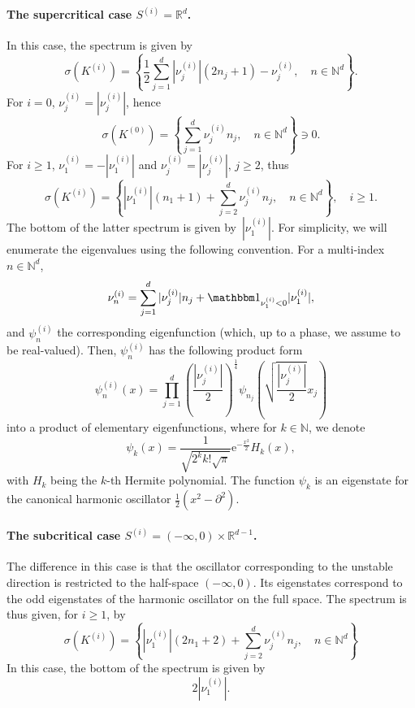 \documentclass[10pt]{article}
\newcommand{\e}{\mathrm{e}}
\newcommand{\R}{\mathbb{R}}
\newcommand{\N}{\mathbb N}
\newcommand{\1}{\mathbbm 1}
\begin{document}
    \paragraph{The supercritical case $S^{(i)} = \R^d$.\newline}
    In this case, the spectrum is given by
    \[\sigma(K^{(i)}) = \left\{ \frac12\sum_{j=1}^d |\nu_j^{(i)}|(2n_j+1)-\nu_j^{(i)},\quad n\in\N^d\right\}.\]
    For $i=0$, $\nu_j^{(i)} = |\nu_j^{(i)}|$, hence
    \[\sigma(K^{(0)}) = \left\{\sum_{j=1}^d \nu_j^{(i)}n_j,\quad n\in\N^d\right\}\ni 0.\]
    For $i\geq 1$, $\nu_1^{(i)} = -|\nu_1^{(i)}|$ and $\nu_j^{(i)} = |\nu_j^{(i)}|,\, j \geq 2$, thus
    \[\sigma(K^{(i)}) = \left\{|\nu_1^{(i)}|(n_1+1)+\sum_{j=2}^d \nu_j^{(i)}n_j,\quad n\in\N^d\right\},\quad i \geq 1.\]
    The bottom of the latter spectrum is given by~$|\nu_1^{(i)}|$. For simplicity, we will enumerate the eigenvalues using the following convention. For a multi-index $n\in \N^d$,
    $$\nu_n^{(i)} = \sum_{j=1}^d |\nu_{j}^{(i)}|n_j + \mathbbm 1_{\nu_1^{(i)}<0}|\nu_1^{(i)}|,$$
    and $\psi^{(i)}_n$ the corresponding eigenfunction (which, up to a phase, we assume to be real-valued). Then, $\psi^{(i)}_n$ has the following product form
    \begin{equation}
        \label{eq:harmonic_eigenstates}
        \psi^{(i)}_n(x) = \prod_{j=1}^d  \left(\frac{|\nu_j^{(i)}|}{2}\right)^{\frac14}\psi_{n_j}\left(\sqrt{\frac{|\nu^{(i)}_j|}2}x_j\right)
    \end{equation}
    into a product of elementary eigenfunctions, where for $k\in\N$, we denote
    $$\psi_k(x) = \frac{1}{\sqrt{2^k k! \sqrt\pi}}\e^{-\frac{x^2}2}H_k(x),$$
    with $H_k$ being the $k$-th Hermite polynomial. The function $\psi_k$ is an eigenstate for the canonical harmonic oscillator $\frac12\left(x^2-\partial^2\right)$.
    
    \paragraph{The subcritical case $S^{(i)} = (-\infty,0)\times \R^{d-1}$.\newline}
    The difference in this case is that the oscillator corresponding to the unstable direction is restricted to the half-space $(-\infty,0)$. Its eigenstates correspond to the odd eigenstates of the harmonic oscillator on the full space. The spectrum is thus given, for $i\geq 1$, by
    \[\sigma(K^{(i)}) = \left\{|\nu_1^{(i)}|(2n_1+2)+\sum_{j=2}^d \nu_j^{(i)}n_j,\quad n\in\N^d\right\}\]
    In this case, the bottom of the spectrum is given by
    $$2|\nu_1^{(i)}|.$$
\end{document}
